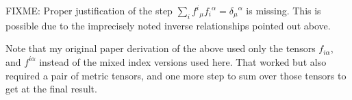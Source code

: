 \documentclass{article}      %
\begin{document}
FIXME: Proper justification of the step $\sum_i {f^i}_{\mu} {f_i}^{\alpha} = {\delta_{\mu}}^{\alpha}$ is missing.  This is possible due
to the imprecisely noted inverse relationships pointed out above.

Note that my original paper derivation of the above used only the tensors $f_{i\alpha}$, and $f^{i\alpha}$ instead of the mixed index versions used here.  That worked but also required a pair of metric tensors, and one more step to sum over those tensors to get at the final result.

%
%
\end{document}
